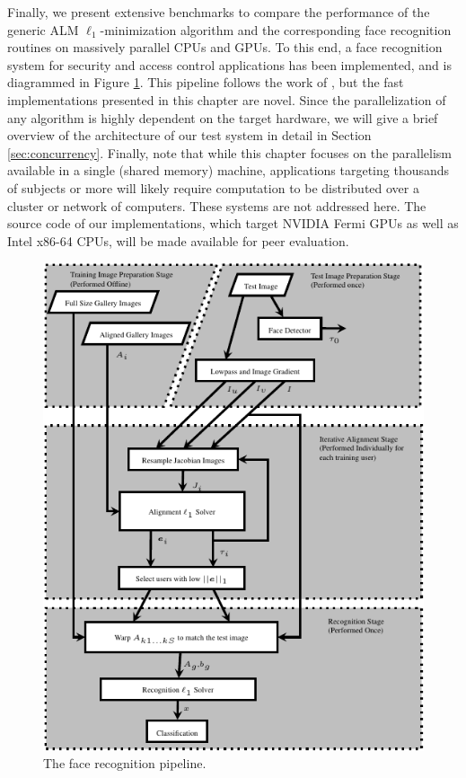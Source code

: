 Finally, we present extensive benchmarks to compare the performance of the
generic ALM $\ell_1$-minimization algorithm and the corresponding face recognition
routines on massively parallel CPUs and GPUs.  To this end, a face
recognition system for security and access control applications has been implemented, 
and is diagrammed in Figure \ref{fig:pipeline}. This pipeline follows the work of \cite{WagnerA2011-PAMI}, but
the fast implementations presented in this chapter are novel.
Since the parallelization of any algorithm
is highly dependent on the target hardware, we will give a brief overview of
the architecture of our test system in detail in Section
\ref{sec:concurrency}.
Finally, note that 
while this chapter focuses on the parallelism available in a single (shared memory) machine,
applications targeting thousands of subjects or more will likely require computation to be
distributed over a cluster or network of computers. These systems are not addressed here.
The source code of our implementations, which target NVIDIA Fermi GPUs
as well as Intel x86-64 CPUs, will be made available for peer evaluation.
\begin{figure}
\centering
\includegraphics[scale=1]{figures_ijcb/pipeline_simplified.pdf}
\caption{The face recognition pipeline.  }
\label{fig:pipeline}
\end{figure}



